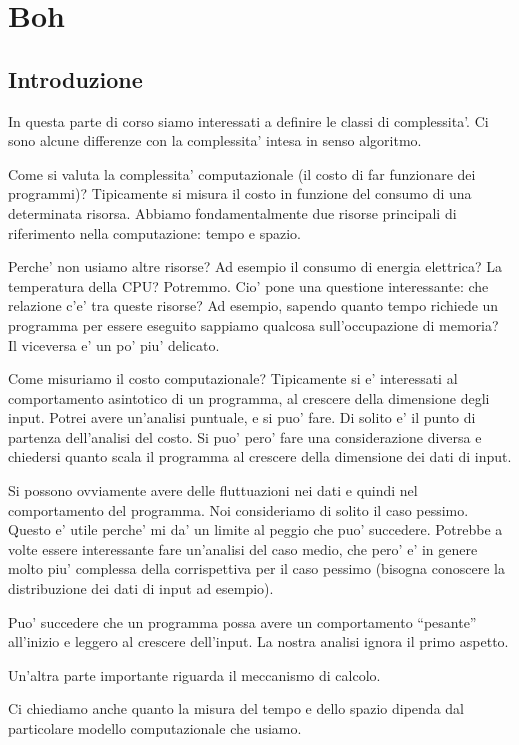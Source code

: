 \chapter{Boh}

\section{Introduzione}

In questa parte di corso siamo interessati a definire le classi di complessita'. Ci sono alcune
differenze con la complessita' intesa in senso algoritmo.

Come si valuta la complessita' computazionale (il costo di far funzionare dei programmi)?
Tipicamente si misura il costo in funzione del consumo di una determinata risorsa. Abbiamo
fondamentalmente due risorse principali di riferimento nella computazione: tempo e spazio.

Perche' non usiamo altre risorse? Ad esempio il consumo di energia elettrica? La temperatura della
CPU? Potremmo. Cio' pone una questione interessante: che relazione c'e' tra queste risorse? Ad
esempio, sapendo quanto tempo richiede un programma per essere eseguito sappiamo qualcosa
sull'occupazione di memoria? Il viceversa e' un po' piu' delicato.

Come misuriamo il costo computazionale? Tipicamente si e' interessati al comportamento asintotico di
un programma, al crescere della dimensione degli input. Potrei avere un'analisi puntuale, e si puo'
fare. Di solito e' il punto di partenza dell'analisi del costo. Si puo' pero' fare una
considerazione diversa e chiedersi quanto scala il programma al crescere della dimensione dei dati
di input.

Si possono ovviamente avere delle fluttuazioni nei dati e quindi nel comportamento del programma.
Noi consideriamo di solito il caso pessimo. Questo e' utile perche' mi da' un limite al peggio che
puo' succedere. Potrebbe a volte essere interessante fare un'analisi del caso medio, che pero' e' in
genere molto piu' complessa della corrispettiva per il caso pessimo (bisogna conoscere la
distribuzione dei dati di input ad esempio).

Puo' succedere che un programma possa avere un comportamento ``pesante'' all'inizio e leggero al
crescere dell'input. La nostra analisi ignora il primo aspetto.

Un'altra parte importante riguarda il meccanismo di calcolo.

Ci chiediamo anche quanto la misura del tempo e dello spazio dipenda dal particolare modello
computazionale che usiamo.

